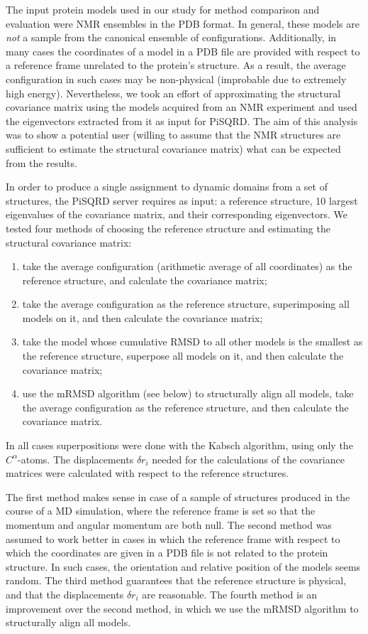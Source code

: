 \documentclass[a4paper,11pt,twoside]{book}%
\begin{document}
\begin{appendices}
The input protein models used in our study for method comparison and evaluation were NMR ensembles in the PDB format.
In general, these models are \emph{not} a sample from the canonical ensemble of configurations.
Additionally, in many cases the coordinates of a model in a PDB file are provided with respect to a reference frame unrelated to the protein's structure.
As a result, the average configuration in such cases may be non-physical (improbable due to extremely high energy).
Nevertheless, we took an effort of approximating the structural covariance matrix using the models acquired from an NMR experiment and used the eigenvectors extracted from it as input for PiSQRD.
The aim of this analysis was to show a potential user (willing to assume that the NMR structures are sufficient to estimate the structural covariance matrix) what can be expected from the results.

In order to produce a single assignment to dynamic domains from a set of structures, the PiSQRD server requires as input: a reference structure, 10 largest eigenvalues of the covariance matrix, and their corresponding eigenvectors.
We tested four methods of choosing the reference structure and estimating the structural covariance matrix:
\begin{enumerate}
 \item take the average configuration (arithmetic average of all coordinates) as the reference structure, and calculate the covariance matrix;
 \item take the average configuration as the reference structure, superimposing all models on it, and then calculate the covariance matrix;
 \item take the model whose cumulative RMSD to all other models is the smallest as the reference structure, superpose all models on it, and then calculate the covariance matrix;
 \item use the mRMSD algorithm (see below) to structurally align all models, take the average configuration as the reference structure, and then calculate the covariance matrix.
\end{enumerate}
In all cases superpositions were done with the Kabsch algorithm, using only the $C^\alpha$-atoms.
The displacements $\delta r_i$ needed for the calculations of the covariance matrices were calculated with respect to the reference structures.

The first method makes sense in case of a sample of structures produced in the course of a MD simulation, where the reference frame is set so that the momentum and angular momentum are both null.
The second method was assumed to work better in cases in which the reference frame with respect to which the coordinates are given in a PDB file is not related to the protein structure.
In such cases, the orientation and relative position of the models seems random.
The third method guarantees that the reference structure is physical, and that the displacements $\delta r_i$ are reasonable.
The fourth method is an improvement over the second method, in which we use the mRMSD algorithm to structurally align all models.


\end{appendices}
\end{document}
